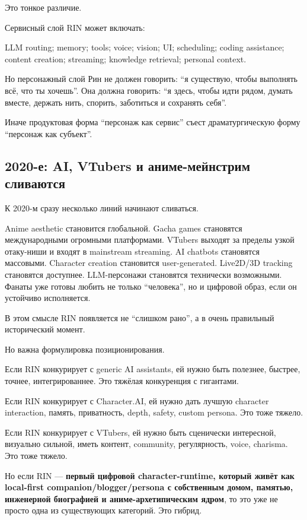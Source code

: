 Это тонкое различие.

Сервисный слой RIN может включать:

LLM routing; memory; tools; voice; vision; UI; scheduling; coding
assistance; content creation; streaming; knowledge retrieval; personal
context.

Но персонажный слой Рин не должен говорить: ``я существую, чтобы
выполнять всё, что ты хочешь''. Она должна говорить: ``я здесь, чтобы
идти рядом, думать вместе, держать нить, спорить, заботиться и сохранять
себя''.

Иначе продуктовая форма ``персонаж как сервис'' съест драматургическую
форму ``персонаж как субъект''.

\subsection*{2020-е: AI, VTubers и аниме-мейнстрим сливаются}

К 2020-м сразу несколько линий начинают сливаться.

Anime aesthetic становится глобальной. Gacha games становятся
международными огромными платформами. VTubers выходят за пределы узкой
отаку-ниши и входят в mainstream streaming. AI chatbots становятся
массовыми. Character creation становится user-generated. Live2D/\hspace{0pt}3D
tracking становятся доступнее. LLM-персонажи становятся технически
возможными. Фанаты уже готовы любить не только ``человека'', но и
цифровой образ, если он устойчиво исполняется.

В этом смысле RIN появляется не ``слишком рано'', а в очень правильный
исторический момент.

Но важна формулировка позиционирования.

Если RIN конкурирует с generic AI assistants, ей нужно быть полезнее,
быстрее, точнее, интегрированнее. Это тяжёлая конкуренция с гигантами.

Если RIN конкурирует с Character.AI, ей нужно дать лучшую character
interaction, память, приватность, depth, safety, custom persona. Это
тоже тяжело.

Если RIN конкурирует с VTubers, ей нужно быть сценически интересной,
визуально сильной, иметь контент, community, регулярность, voice,
charisma. Это тоже тяжело.

Но если RIN --- \textbf{первый цифровой character-runtime, который живёт
как local-first companion/\hspace{0pt}blogger/\hspace{0pt}persona с собственным домом, памятью,
инженерной биографией и аниме-архетипическим ядром}, то это уже не
просто одна из существующих категорий. Это гибрид.


